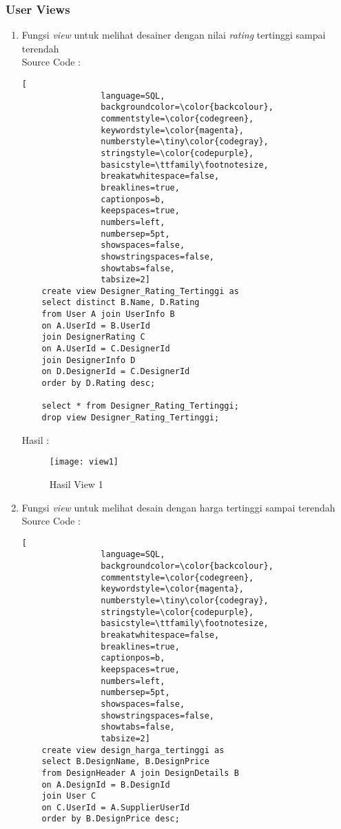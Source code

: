 \subsubsection{User Views}
\begin{enumerate}
	\item 	Fungsi \textit{view} untuk melihat desainer dengan nilai \textit{rating} tertinggi sampai terendah \\
			Source Code :
			\begin{lstlisting}[
				language=SQL,
				backgroundcolor=\color{backcolour},   
				commentstyle=\color{codegreen},
				keywordstyle=\color{magenta},
				numberstyle=\tiny\color{codegray},
				stringstyle=\color{codepurple},
				basicstyle=\ttfamily\footnotesize,
				breakatwhitespace=false,         
				breaklines=true,                 
				captionpos=b,                    
				keepspaces=true,                 
				numbers=left,                    
				numbersep=5pt,                  
				showspaces=false,                
				showstringspaces=false,
				showtabs=false,                  
				tabsize=2]
	create view Designer_Rating_Tertinggi as
	select distinct B.Name, D.Rating
	from User A join UserInfo B
	on A.UserId = B.UserId
	join DesignerRating C
	on A.UserId = C.DesignerId
	join DesignerInfo D
	on D.DesignerId = C.DesignerId
	order by D.Rating desc;
		
	select * from Designer_Rating_Tertinggi;
	drop view Designer_Rating_Tertinggi;
			\end{lstlisting} 
		Hasil : 
		\\
		\begin{figure}[H]
			\centering
			\texttt{[image: view1]}
			\caption{Hasil View 1}
		\end{figure}
	\item	Fungsi \textit{view} untuk melihat desain dengan harga tertinggi sampai terendah \\
			Source Code :
			\begin{lstlisting}[
				language=SQL,
				backgroundcolor=\color{backcolour},   
				commentstyle=\color{codegreen},
				keywordstyle=\color{magenta},
				numberstyle=\tiny\color{codegray},
				stringstyle=\color{codepurple},
				basicstyle=\ttfamily\footnotesize,
				breakatwhitespace=false,         
				breaklines=true,                 
				captionpos=b,                    
				keepspaces=true,                 
				numbers=left,                    
				numbersep=5pt,                  
				showspaces=false,                
				showstringspaces=false,
				showtabs=false,                  
				tabsize=2]
	create view design_harga_tertinggi as
	select B.DesignName, B.DesignPrice
	from DesignHeader A join DesignDetails B
	on A.DesignId = B.DesignId
	join User C
	on C.UserId = A.SupplierUserId
	order by B.DesignPrice desc;
	

\end{lstlisting}
\end{enumerate}
